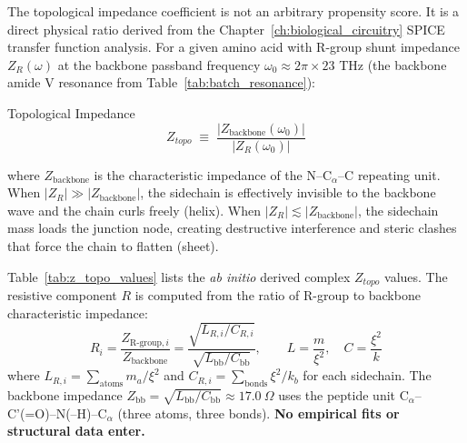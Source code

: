 The topological impedance coefficient is not an arbitrary propensity score. It is a direct physical ratio derived from the Chapter~\ref{ch:biological_circuitry} SPICE transfer function analysis. For a given amino acid with R-group shunt impedance $Z_R(\omega)$ at the backbone passband frequency $\omega_0 \approx 2\pi \times 23$ THz (the backbone amide V resonance from Table~\ref{tab:batch_resonance}):
\begin{resultbox}{Topological Impedance}
\begin{equation}
    Z_{topo} \;\equiv\; \frac{|Z_{\text{backbone}}(\omega_0)|}{|Z_R(\omega_0)|}
    \label{eq:z_topo_def}
\end{equation}
\end{resultbox}
where $Z_{\text{backbone}}$ is the characteristic impedance of the N--C$_\alpha$--C repeating unit. When $|Z_R| \gg |Z_{\text{backbone}}|$, the sidechain is effectively invisible to the backbone wave and the chain curls freely (helix). When $|Z_R| \lesssim |Z_{\text{backbone}}|$, the sidechain mass loads the junction node, creating destructive interference and steric clashes that force the chain to flatten (sheet).

Table~\ref{tab:z_topo_values} lists the \emph{ab initio} derived complex $Z_{topo}$ values.  The resistive component $R$ is computed from the ratio of R-group to backbone characteristic impedance:
\begin{equation}
    R_i = \frac{Z_{\text{R-group},i}}{Z_{\text{backbone}}} = \frac{\sqrt{L_{R,i} / C_{R,i}}}{\sqrt{L_{\text{bb}} / C_{\text{bb}}}}, \qquad L = \frac{m}{\xi^2},\quad C = \frac{\xi^2}{k}
    \label{eq:z_topo_derivation}
\end{equation}
where $L_{R,i} = \sum_{\text{atoms}} m_a / \xi^2$ and $C_{R,i} = \sum_{\text{bonds}} \xi^2 / k_b$ for each sidechain.  The backbone impedance $Z_{\text{bb}} = \sqrt{L_{\text{bb}}/C_{\text{bb}}} \approx 17.0~\Omega$ uses the peptide unit C$_\alpha$--C'(=O)--N(--H)--C$_\alpha$ (three atoms, three bonds).  \textbf{No empirical fits or structural data enter.}

